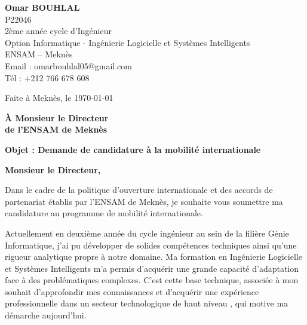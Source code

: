 \documentclass[11pt,a4paper]{article}
\begin{document}
{\bfseries Omar BOUHLAL} \\
P22046 \\
2ème année cycle d’Ingénieur \\
Option Informatique - Ingénierie Logicielle et Systèmes Intelligents \\
ENSAM – Meknès \\
Email : omarbouhlal05@gmail.com \\
Tél : +212 766 678 608

\vspace{2em}

\hfill Faite à Meknès, le \today

\vspace{1em}

\hfill \begin{minipage}{0.5\textwidth}
\raggedleft
{\bfseries À Monsieur le Directeur \\
de l'ENSAM de Meknès}
\end{minipage}

\vspace{1em}

{\bfseries Objet : Demande de candidature à la mobilité internationale}

\vspace{2em}

{\bfseries Monsieur le Directeur,}

\vspace{1em}

Dans le cadre de la politique d'ouverture internationale et des accords de partenariat établis par l'ENSAM de Meknès, je souhaite vous soumettre ma candidature au programme de mobilité
internationale.

Actuellement en deuxième année du cycle ingénieur au sein de la filière Génie Informatique, j'ai pu développer de solides compétences techniques ainsi qu'une rigueur analytique propre à notre domaine. Ma formation en Ingénierie Logicielle et Systèmes Intelligents m'a permis d'acquérir une grande capacité d'adaptation face à des problématiques complexes. C'est cette base technique, associée à mon souhait d'approfondir mes connaissances et d'acquérir une expérience
professionnelle dans un secteur technologique de haut niveau , qui motive ma démarche aujourd'hui.
\end{document}
